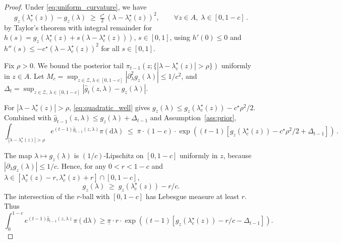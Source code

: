 \documentclass[10pt,a4paper]{amsart}
\newcommand{\calZ}{\mathcal{Z}}
\newcommand{\fbet}{\lambda}  %
\begin{document}
\begin{proof}
Under \eqref{eq:uniform_curvature}, we have
\begin{equation}\label{eq:quadratic_well}
    g_z(\fbet^\star_c(z))-g_z(\lambda) \;\ge\; \tfrac{c^\star}{2}\,(\lambda-\fbet^\star_c(z))^2,
    \qquad \forall z\in A,\;\lambda\in[0,1-c]\,.
\end{equation}
by Taylor's theorem with integral remainder for $h(s)=g_z(\fbet^\star_c(z)+s(\lambda-\fbet^\star_c(z)))$, $s\in[0,1]$, using $h'(0)\le 0$ and $h''(s)\le -c^\star(\lambda-\fbet^\star_c(z))^2$ for all $s\in[0,1]$.


Fix $\rho>0$. We bound the posterior tail
$\pi_{t-1}(z;\{|\lambda-\fbet^\star_c(z)|>\rho\})$ uniformly in $z\in A$.
Let $M_c=\sup_{z\in\calZ,\lambda\in[0,1-c]}|\partial_\lambda^2 g_z(\lambda)|\le 1/c^2$, and $\Delta_t=\sup_{z\in\calZ,\,\lambda\in[0,1-c]}|\hat g_t(z,\lambda)-g_z(\lambda)|$. 

For
$|\lambda-\fbet^\star_c(z)|>\rho$, \eqref{eq:quadratic_well} gives
$g_z(\lambda)\le g_z(\fbet^\star_c(z))-c^\star\rho^2/2$. Combined with
$\hat g_{t-1}(z,\lambda)\le g_z(\lambda)+\Delta_{t-1}$ and
Assumption~\ref{ass:prior},
\begin{equation*}
    \int_{|\lambda-\fbet^\star_c(z)|>\rho} e^{(t-1)\hat g_{t-1}(z,\lambda)}\pi(\mathrm{d}\lambda)
    \;\le\; \overline\pi\cdot(1-c)\cdot
    \exp\left((t-1)[g_z(\fbet^\star_c(z))-c^\star\rho^2/2+\Delta_{t-1}]\right)\,.
\end{equation*}

The map $\lambda\mapsto g_z(\lambda)$
is $(1/c)$-Lipschitz on $[0,1-c]$ uniformly in $z$, because
$|\partial_\lambda g_z(\lambda)|\le 1/c$. Hence, for any $0<r<1-c$ and $\lambda\in [\fbet^\star_c(z)-r,\fbet^\star_c(z)+r]\cap[0,1-c]$,
\begin{equation*}
    g_z(\lambda) \;\ge\; g_z(\fbet^\star_c(z)) - r/c.
\end{equation*}
The
intersection of the $r$-ball with $[0,1-c]$ has Lebesgue measure at
least $r$. Thus
\begin{equation*}
    \int_0^{1-c} e^{(t-1)\hat g_{t-1}(z,\lambda)}\pi(\mathrm{d}\lambda)
   \geq \underline\pi\cdot r\cdot
    \exp\left((t-1)[g_z(\fbet^\star_c(z))-r/c-\Delta_{t-1}]\right).
\end{equation*}


\end{proof}
\end{document}
